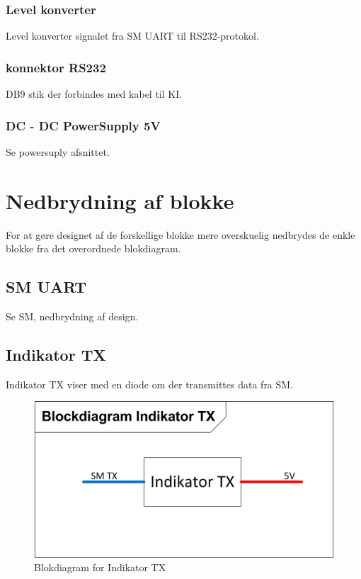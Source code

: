 \subsubsection{Level konverter}
Level konverter signalet fra SM UART til RS232-protokol.
\subsubsection{konnektor RS232}
DB9 stik der forbindes med kabel til KI.
\subsubsection{DC - DC PowerSupply 5V}
Se powersuply afsnittet.
\newpage
\section{Nedbrydning af blokke}
For at gøre designet af de forskellige blokke mere overskuelig nedbrydes de enkle blokke fra det overordnede blokdiagram.
\subsection{SM UART}
Se SM, nedbrydning af design.
\subsection{Indikator TX}
Indikator TX viser med en diode om der transmittes data fra SM.
\begin{figure}[H]
\centering
\includegraphics[scale=1]{billeder/Indikator_TXblok}
\caption{Blokdiagram for Indikator TX}
\label{fig:Indikator_TX}
\end{figure}
